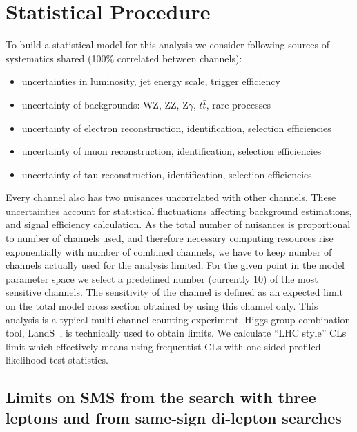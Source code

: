 \newpage
\section{Statistical Procedure}
To build a statistical model for this analysis we consider following sources of systematics
shared (100\% correlated between channels):
\begin{itemize}
\item uncertainties in luminosity, jet energy scale, trigger efficiency
\item uncertainty of backgrounds: WZ, ZZ, Z$\gamma$, $t\bar{t}$, rare processes
\item uncertainty of electron reconstruction, identification, selection efficiencies
\item uncertainty of muon reconstruction, identification, selection efficiencies
\item uncertainty of tau reconstruction, identification, selection efficiencies
\end{itemize}
Every channel also has two nuisances uncorrelated with other channels.
These uncertainties account for statistical fluctuations affecting
background estimations, and signal efficiency calculation.
As the total number of nuisances is proportional to number of channels used,
and therefore necessary computing resources rise exponentially with number
of combined channels,
we have to keep number of channels actually used for the analysis limited.
For the given point in the model parameter space we select a predefined
number (currently 10) of the most sensitive
channels. The sensitivity of the channel is defined as an expected limit
on the total model cross section obtained by using this channel only.
This analysis is a typical multi-channel counting experiment. Higgs group combination
tool, LandS~\cite{lands}, is technically used to obtain limits.
We calculate ``LHC style'' CLs limit%
which effectively means using frequentist CLs with one-sided profiled likelihood
test statistics.


\subsection{Limits on SMS from the search with three leptons and from same-sign di-lepton searches}
\label{tri-ss-combine}

